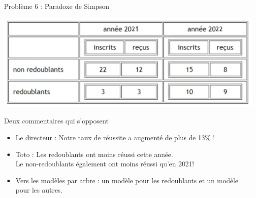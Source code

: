 \documentclass[10pt]{beamer}
\begin{document}
\begin{frame}{Problème 6 : Paradoxe de Simpson} 
 
 \begin{center}
\includegraphics[height=0.34\textwidth]{figures/SIMPSON_tableau.png}
\end{center} 

\begin{block}{Deux commentaires qui s'opposent}
\small {\begin{itemize}
\item Le directeur : Notre taux de réussite a augmenté de plus de 13\% !
\item Toto : Les redoublants ont moins réussi cette année. \\
            \hspace{0.06\textwidth} Le non-redoublants également ont moins réussi qu'en 2021!
\item Vers les modèles par arbre : un modèle pour les redoublants et un modèle pour les autres. 
\end{itemize}}
\end{block} 

\end{frame}
\end{document}
